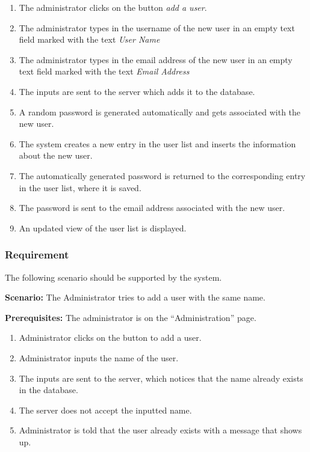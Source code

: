\documentclass{article}
\begin{document}
\begin{enumerate}
    \item The administrator clicks on the button \emph{add a user}.
    \item The administrator types in the username of the new user in an empty text field marked with the text \emph{User Name}
    \item The administrator types in the email address of the new user in an empty text field marked with the text \emph{Email Address}
    \item The inputs are sent to the server which adds it to the database.
    \item A random password is generated automatically and gets associated with the new user.
    \item The system creates a new entry in the user list and inserts the information about the new user.
    \item The automatically generated password is returned to the corresponding entry in the user list, where it is saved.
    \item The password is sent to the email address associated with the new user.
    \item An updated view of the user list is displayed.
\end{enumerate}

\subsubsection{Requirement}
The following scenario should be supported by the system.

\textbf{Scenario:} The Administrator tries to add a user with the same name.

\textbf{Prerequisites:} The administrator is on the “Administration” page.

\begin{enumerate}
    \item Administrator clicks on the button to add a user.
    \item Administrator inputs the name of the user.
    \item The inputs are sent to the server, which notices that the name already exists in the database.
    \item The server does not accept the inputted name.
    \item Administrator is told that the user already exists with a message that shows up.
\end{enumerate}
\end{document}
